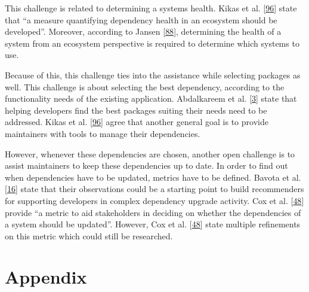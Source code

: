 \documentclass[]{book}
\begin{document}
This challenge is related to determining a systems health. Kikas et al.
{[}\protect\hyperlink{ref-Kikas2017}{96}{]} state that ``a measure
quantifying dependency health in an ecosystem should be developed''.
Moreover, according to Jansen
{[}\protect\hyperlink{ref-Jansen2014}{88}{]}, determining the health of
a system from an ecosystem perspective is required to determine which
systems to use.

Because of this, this challenge ties into the assistance while selecting
packages as well. This challenge is about selecting the best dependency,
according to the functionality needs of the existing application.
Abdalkareem et al. {[}\protect\hyperlink{ref-Abdalkareem2017}{3}{]}
state that helping developers find the best packages suiting their needs
need to be addressed. Kikas et al.
{[}\protect\hyperlink{ref-Kikas2017}{96}{]} agree that another general
goal is to provide maintainers with tools to manage their dependencies.

However, whenever these dependencies are chosen, another open challenge
is to assist maintainers to keep these dependencies up to date. In order
to find out when dependencies have to be updated, metrics have to be
defined. Bavota et al. {[}\protect\hyperlink{ref-Bavota2014}{16}{]}
state that their observations could be a starting point to build
recommenders for supporting developers in complex dependency upgrade
activity. Cox et al. {[}\protect\hyperlink{ref-Cox2015}{48}{]} provide
``a metric to aid stakeholders in deciding on whether the dependencies
of a system should be updated''. However, Cox et al.
{[}\protect\hyperlink{ref-Cox2015}{48}{]} state multiple refinements on
this metric which could still be researched.

\hypertarget{appendix}{\section{Appendix}\label{appendix}}
\end{document}
